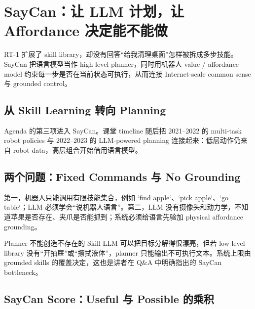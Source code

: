 \section{SayCan：让 LLM 计划，让 Affordance 决定能不能做}

RT-1 扩展了 skill library，却没有回答“给我清理桌面”怎样被拆成多步技能。SayCan 把语言模型当作 high-level planner，同时用机器人 value / affordance model 约束每一步是否在当前状态可执行，从而连接 Internet-scale common sense 与 grounded control。

\subsection{从 Skill Learning 转向 Planning}

Agenda 的第三项进入 SayCan。课堂 timeline 随后把 2021--2022 的 multi-task robot policies 与 2022--2023 的 LLM-powered planning 连接起来：低层动作仍来自 robot data，高层组合开始借用语言模型。



\subsection{两个问题：Fixed Commands 与 No Grounding}

第一，机器人只能调用有限技能集合，例如 `find apple`、`pick apple`、`go table`；LLM 必须学会“说机器人语言”。第二，LLM 没有摄像头和动力学，不知道苹果是否存在、夹爪是否能抓到；系统必须给语言先验加 physical affordance grounding。


\begin{warningbox}{Planner 不能创造不存在的 Skill}
LLM 可以把目标分解得很漂亮，但若 low-level library 没有“开抽屉”或“擦拭液体”，planner 只能输出不可执行文本。系统上限由 grounded skills 的覆盖决定，这也是讲者在 Q\&A 中明确指出的 SayCan bottleneck。
\end{warningbox}

\subsection{SayCan Score：Useful 与 Possible 的乘积}

